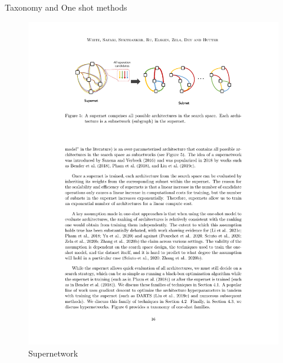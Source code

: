 \documentclass[aspectratio=169,xcolor=dvipsnames]{beamer}
\begin{document}
\begin{frame}{Taxonomy and One shot methods}
\begin{figure}[htbp]
        \includegraphics[height=.3\textheight]{supernetwork.pdf}
        \caption{Supernetwork}
    \end{figure}
\end{frame}
\end{document}
